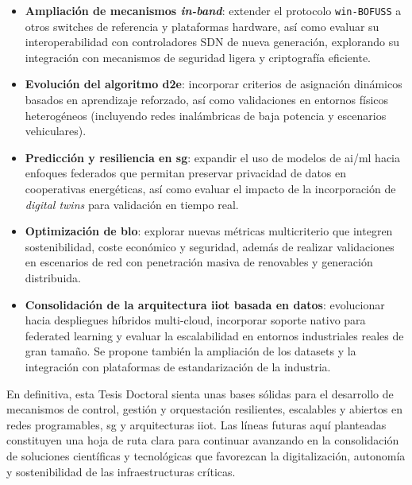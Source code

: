 \begin{itemize}
    \item \textbf{Ampliación de mecanismos \textit{in-band}}: extender el protocolo \texttt{win-BOFUSS} a otros switches de referencia y plataformas hardware, así como evaluar su interoperabilidad con controladores SDN de nueva generación, explorando su integración con mecanismos de seguridad ligera y criptografía eficiente.
    
    \item \textbf{Evolución del algoritmo \gls{d2e}}: incorporar criterios de asignación dinámicos basados en aprendizaje reforzado, así como validaciones en entornos físicos heterogéneos (incluyendo redes inalámbricas de baja potencia y escenarios vehiculares).
    
    \item \textbf{Predicción y resiliencia en \gls{sg}}: expandir el uso de modelos de \gls{ai}/\gls{ml} hacia enfoques federados que permitan preservar privacidad de datos en cooperativas energéticas, así como evaluar el impacto de la incorporación de \textit{digital twins} para validación en tiempo real.
    
    \item \textbf{Optimización de \gls{blo}}: explorar nuevas métricas multicriterio que integren sostenibilidad, coste económico y seguridad, además de realizar validaciones en escenarios de red con penetración masiva de renovables y generación distribuida.
    
    \item \textbf{Consolidación de la arquitectura \gls{iiot} basada en datos}: evolucionar hacia despliegues híbridos multi-cloud, incorporar soporte nativo para federated learning y evaluar la escalabilidad en entornos industriales reales de gran tamaño. Se propone también la ampliación de los datasets y la integración con plataformas de estandarización de la industria.
\end{itemize}

En definitiva, esta Tesis Doctoral sienta unas bases sólidas para el desarrollo de mecanismos de control, gestión y orquestación resilientes, escalables y abiertos en redes programables, \gls{sg} y arquitecturas \gls{iiot}. Las líneas futuras aquí planteadas constituyen una hoja de ruta clara para continuar avanzando en la consolidación de soluciones científicas y tecnológicas que favorezcan la digitalización, autonomía y sostenibilidad de las infraestructuras críticas.